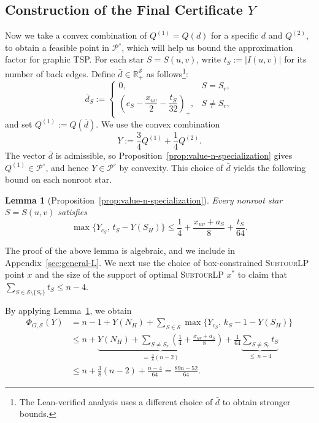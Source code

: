 \documentclass[11pt]{amsart}
\DeclareMathOperator{\R}{\mathbb{R}}
\def\R{{\mathbb R}}
\newcommand{\1}{\mathbbm{1}}
\newcommand{\SubtourLP}{\textsc{SubtourLP}}
\newtheorem{lemma}[theorem]{Lemma}
\begin{document}
\subsection{Construction of the Final Certificate $Y$}
Now we take a convex combination of $Q^{(1)}= Q(d)$ for a specific $d$ and $Q^{(2)}$, to obtain a feasible point in $\mathcal{P}^\circ$, which will help us bound the approximation factor for graphic TSP. For each star $S=S(u,v)$, write $t_S:=|I(u,v)|$ for its
number of back edges. {Define $\bar d\in\R_+^{\mathcal S}$ as follows}\footnote{The Lean-verified analysis uses a different choice
of $\bar d$ to obtain stronger bounds.}:
\[
 \bar d_S:=
 \begin{cases}
  0,&S=S_r,\\[4pt]
  \left(e_S-\dfrac{x_{uv}}{2}-\dfrac{t_S}{32}\right)_+,
       &S\ne S_r,
 \end{cases}
\]
and set $Q^{(1)}:=Q(\bar d)$. We use the convex combination
\begin{equation}\label{proc:mixture}
 Y:=\frac34Q^{(1)}+\frac14Q^{(2)}.
\end{equation}
The vector $\bar d$ is admissible, so
Proposition~\ref{prop:value-n-specialization} gives
$Q^{(1)}\in\mathcal P^\circ$, and hence $Y\in\mathcal P^\circ$
by convexity. This choice of $\bar d$ yields the following
bound on each nonroot star. 

\begin{lemma}[{Proposition~\ref{prop:value-n-specialization}}]
\label{proc:local-star-bound}
Every nonroot star $S=S(u,v)$ satisfies
\[
 \max\{Y_{c_S},\,t_S-Y(S_H)\}
 \le\frac14+\frac{x_{uv}+a_S}{8}+\frac{t_S}{64}.
\]
\end{lemma}

{The proof of the above lemma is algebraic, and we include in Appendix~\ref{sec:general-L}. We next use the choice of box-constrained \SubtourLP{} point $x$ and the size of the support of optimal \SubtourLP{} $x^*$ to claim that $\sum_{S\in \mathcal S\setminus \{S_r\} } t_S \leq n-4$. 

By applying Lemma~\ref{proc:local-star-bound},
we obtain
\[
\begin{aligned}
 \Phi_{G,\mathcal S}(Y)
 &=n-1+Y(N_H)
   +\sum_{S\in\mathcal S}
      \max\{Y_{c_S},\,k_S-1-Y(S_H)\}\\[6pt] 
 &\le n+
   \underbrace{
     Y(N_H)+\sum_{S\ne S_r}
       \left(\frac14+\frac{x_{uv}+a_S}{8}\right)
   }_{=\,\frac38(n-2)}
   +\frac1{64}
    \underbrace{\sum_{S\ne S_r}t_S}_{\le\,n-4}\\[10pt]
 &\le n+\frac38(n-2)+\frac{n-4}{64}
  =\frac{89n-52}{64}.
\end{aligned}
\]}
\end{document}
